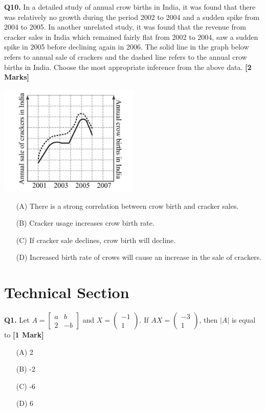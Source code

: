 \documentclass[11pt]{article}
\newcommand{\questiona}[2]{
    \noindent\textbf{Q#2.} #1 \hfill \textbf{[1 Mark]}
}
\newcommand{\questionb}[2]{
    \noindent\textbf{Q#2.} #1 \hfill \textbf{[2 Marks]}
}
\begin{document}
\questionb{In a detailed study of annual crow births in India, it was found that there was relatively no growth during the period 2002 to 2004 and a sudden spike from 2004 to 2005. In another unrelated study, it was found that the revenue from cracker sales in India which remained fairly flat from 2002 to 2004, saw a sudden spike in 2005 before declining again in 2006. The solid line in the graph below refers to annual sale of crackers and the dashed line refers to the annual crow births in India. Choose the most appropriate inference from the above data.}{10}
\begin{center}
\includegraphics[width=0.5\textwidth]{figures/10.png}
\end{center}
\begin{enumerate}
    \item[(A)] There is a strong correlation between crow birth and cracker sales.
    \item[(B)] Cracker usage increases crow birth rate.
    \item[(C)] If cracker sale declines, crow birth will decline.
    \item[(D)] Increased birth rate of crows will cause an increase in the sale of crackers.
\end{enumerate}
\vspace{0.5cm}

\section*{Technical Section}

\questiona{Let \( A = \begin{bmatrix} a & b \\ 2 & -b \end{bmatrix} \) and \( X = \begin{pmatrix} -1 \\ 1 \end{pmatrix} \). If \( AX = \begin{pmatrix} -3 \\ 1 \end{pmatrix} \), then \( |A| \) is equal to}{1}
\begin{enumerate}
    \item[(A)] 2
    \item[(B)] -2
    \item[(C)] -6
    \item[(D)] 6
\end{enumerate}
\vspace{0.5cm}
\end{document}
